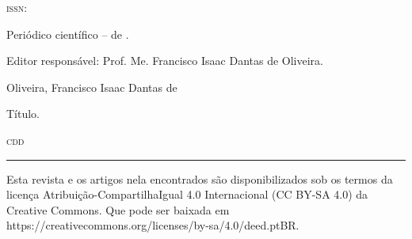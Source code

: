 {\begin{center}
\begin{minipage}[c]{12.5cm}
\begin{flushleft}
	\medskip
	
	\hspace{6.5mm}\textsc{issn}: \journalISSN
	
	\medskip
	
	\hspace{6.5mm}Periódico científico -- \journalsemester{} de \journalyear{}.\\
	
	\medskip
	
	Editor responsável: Prof. Me. Francisco Isaac Dantas de Oliveira.\\
	
	\medskip
	
	\begin{inparaenum}[1.]
        \item \makefirstuc{\keywordone}
        \item \makefirstuc{\keywordtwo}
        \item \makefirstuc{\keywordthree}
        \item \makefirstuc{\keywordfour}
        \item \makefirstuc{\keywordfive}
	\end{inparaenum}
	\begin{inparaenum}[I.]
		\item Oliveira, Francisco Isaac Dantas de
		\item Título.
	\end{inparaenum}
	
	\hfill \textsc{cdd} \journalCDD
	
	\end{flushleft}
	\end{minipage}
	\end{center}
	\hrule
	
	\vspace*{\fill}
	
	{
	\centering \small \noindent Esta revista e os artigos nela encontrados são disponibilizados sob os termos da licença Atribuição-CompartilhaIgual 4.0 Internacional (CC BY-SA 4.0) da Creative Commons. Que pode ser baixada em https://creativecommons.org/licenses/by-sa/4.0/deed.pt\textunderscore{}BR.\\
	}
	\begin{center}
	    \ccbysa
	\end{center}
	\clearpage
}

\newcommand{\chapterOneLine}[1]{%
  \chapter[#1]{\uppercase{#1}}%
}

